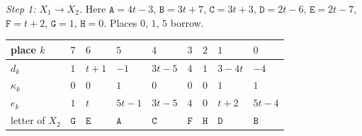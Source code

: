 \documentclass[11pt,letterpaper]{article}
\theoremstyle{paperstyle}
\theoremstyle{paperstyledef}
\theoremstyle{paperstylerem}
\begin{document}
\emph{Step 1: \(X_1 \to X_2\).} Here \(\mathtt{A} = 4t-3\), \(\mathtt{B} = 3t+7\), \(\mathtt{C} = 3t+3\), \(\mathtt{D} = 2t-6\), \(\mathtt{E} = 2t-7\), \(\mathtt{F} = t+2\), \(\mathtt{G} = 1\), \(\mathtt{H} = 0\). Places \(0\), \(1\), \(5\) borrow.

{\def\LTcaptype{none} %
\begin{longtable}[]{@{}
  >{\raggedright\arraybackslash}p{}
  >{\raggedright\arraybackslash}p{}
  >{\raggedright\arraybackslash}p{}
  >{\raggedright\arraybackslash}p{}
  >{\raggedright\arraybackslash}p{}
  >{\raggedright\arraybackslash}p{}
  >{\raggedright\arraybackslash}p{}
  >{\raggedright\arraybackslash}p{}
  >{\raggedright\arraybackslash}p{}@{}}
\toprule\noalign{}
\begin{minipage}[b]{\linewidth}\raggedright
place \(k\)
\end{minipage} & \begin{minipage}[b]{\linewidth}\raggedright
\(7\)
\end{minipage} & \begin{minipage}[b]{\linewidth}\raggedright
\(6\)
\end{minipage} & \begin{minipage}[b]{\linewidth}\raggedright
\(5\)
\end{minipage} & \begin{minipage}[b]{\linewidth}\raggedright
\(4\)
\end{minipage} & \begin{minipage}[b]{\linewidth}\raggedright
\(3\)
\end{minipage} & \begin{minipage}[b]{\linewidth}\raggedright
\(2\)
\end{minipage} & \begin{minipage}[b]{\linewidth}\raggedright
\(1\)
\end{minipage} & \begin{minipage}[b]{\linewidth}\raggedright
\(0\)
\end{minipage} \\
\midrule\noalign{}
\endhead
\bottomrule\noalign{}
\endlastfoot
\(d_k\) & \(1\) & \(t+1\) & \(-1\) & \(3t-5\) & \(4\) & \(1\) & \(3-4t\) & \(-4\) \\
\(\kappa_k\) & \(0\) & \(0\) & \(1\) & \(0\) & \(0\) & \(0\) & \(1\) & \(1\) \\
\(e_k\) & \(1\) & \(t\) & \(5t-1\) & \(3t-5\) & \(4\) & \(0\) & \(t+2\) & \(5t-4\) \\
letter of \(X_2\) & \(\mathtt{G}\) & \(\mathtt{E}\) & \(\mathtt{A}\) & \(\mathtt{C}\) & \(\mathtt{F}\) & \(\mathtt{H}\) & \(\mathtt{D}\) & \(\mathtt{B}\) \\
\end{longtable}
}
\end{document}
